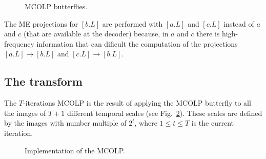 \begin{figure}
  \centering {}
  
  
  
  \caption{MCOLP butterflies.}
  \label{fig:forward_butterfly}
\end{figure}

The ME projections for $[b.L]$ are performed with $[a.L]$ and $[c.L]$
instead of $a$ and $c$ (that are available at the decoder) because, in
$a$ and $c$ there is high-frequency information that can dificult the
computation of the projections $[a.L]\rightarrow [b.L]$ and
$[c.L]\rightarrow [b.L]$.



\subsection{The transform}
The $T$-iterations MCOLP is the result of applying the MCOLP butterfly
to all the images of $T+1$ different temporal scales (see
Fig.~\ref{fig:MCOLP}). These scales are defined by the images with
number multiple of $2^t$, where $1\leq t\leq T$ is the current
iteration.

\begin{figure}
  \centering
  
  
  \caption{Implementation of the MCOLP.}
  \label{fig:MCOLP}
\end{figure}


